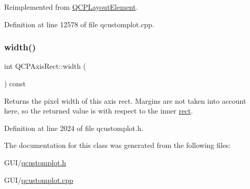 Reimplemented from \hyperlink{class_q_c_p_layout_element_a300521d2fd18a893c1b85f6be11ce2bf}{Q\+C\+P\+Layout\+Element}.



Definition at line 12578 of file qcustomplot.\+cpp.

\mbox{\label{class_q_c_p_axis_rect_a204645398a4f9d0b0189385c7c2cfb91}} 
\subsubsection{\texorpdfstring{width()}{width()}}
{\footnotesize\ttfamily int Q\+C\+P\+Axis\+Rect\+::width (\begin{DoxyParamCaption}{ }\end{DoxyParamCaption}) const\hspace{0.3cm}{\ttfamily [inline]}}

Returns the pixel width of this axis rect. Margins are not taken into account here, so the returned value is with respect to the inner \hyperlink{class_q_c_p_layout_element_a208effccfe2cca4a0eaf9393e60f2dd4}{rect}. 

Definition at line 2024 of file qcustomplot.\+h.



The documentation for this class was generated from the following files\+:\begin{DoxyCompactItemize}
\item 
G\+U\+I/\hyperlink{qcustomplot_8h}{qcustomplot.\+h}\item 
G\+U\+I/\hyperlink{qcustomplot_8cpp}{qcustomplot.\+cpp}\end{DoxyCompactItemize}
